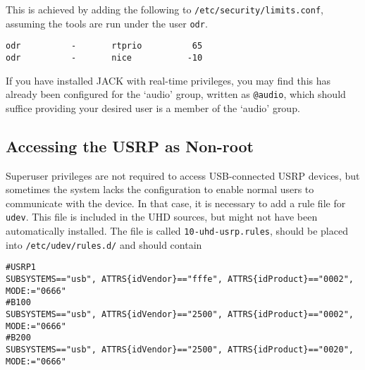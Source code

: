 This is achieved by adding the following to \texttt{/etc/security/limits.conf},
assuming the tools are run under the user \texttt{odr}.

\begin{lstlisting}
odr          -       rtprio          65
odr          -       nice           -10
\end{lstlisting}

If you have installed JACK with real-time privileges, you may find this has
already been configured for the `audio' group, written as \texttt{@audio}, which
should suffice providing your desired user is a member of the `audio' group.

\subsection{Accessing the USRP as Non-root}

Superuser privileges are not required to access USB-connected USRP devices, but
sometimes the system lacks the configuration to enable normal users to
communicate with the device.
In that case, it is necessary to add a rule file for \texttt{udev}. This file is
included in the UHD sources, but might not have been automatically installed.
The file is called \texttt{10-uhd-usrp.rules}, should be placed into
\texttt{/etc/udev/rules.d/} and should contain

{ \footnotesize
\begin{verbatim}
#USRP1
SUBSYSTEMS=="usb", ATTRS{idVendor}=="fffe", ATTRS{idProduct}=="0002", MODE:="0666"
#B100
SUBSYSTEMS=="usb", ATTRS{idVendor}=="2500", ATTRS{idProduct}=="0002", MODE:="0666"
#B200
SUBSYSTEMS=="usb", ATTRS{idVendor}=="2500", ATTRS{idProduct}=="0020", MODE:="0666"
\end{verbatim}
}

